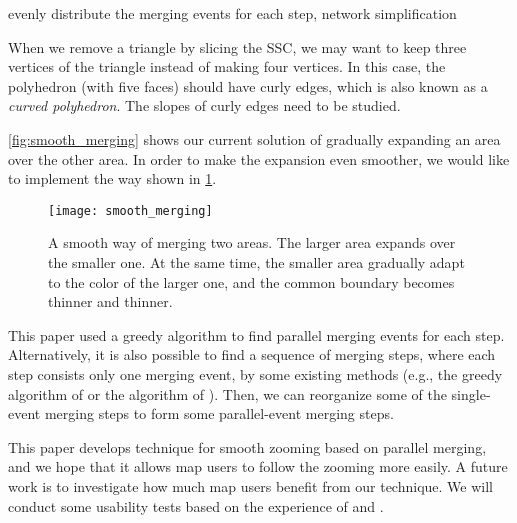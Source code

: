 \documentclass[ijgi,article,submit,moreauthors,pdftex]{Definitions/mdpi}
\begin{document}
evenly distribute the merging events for each step, 
network simplification

When we remove a triangle by slicing the SSC, 
we may want to keep three vertices of the triangle 
instead of making four vertices.
In this case, the polyhedron (with five faces) should have curly edges,
which is also known as a \emph{curved polyhedron}.
The slopes of curly edges need to be studied.

\fig\ref{fig:smooth_merging} shows our current solution of
gradually expanding an area over the other area.
In order to make the expansion even smoother,
we would like to implement the way 
shown in \fig\ref{fig:smooth_merging_future}.

\begin{figure}[tb]
\centering
\texttt{[image: smooth\_merging]}
\caption{A smooth way of merging two areas.
    The larger area expands over the smaller one.
    At the same time, 
    the smaller area gradually adapt to the color of the larger one,
    and the common boundary becomes thinner and thinner.}
\label{fig:smooth_merging_future}
\end{figure}

This paper used a greedy algorithm 
to find parallel merging events for each step.
Alternatively, it is also possible to find a sequence of merging steps,
where each step consists only one merging event, by some existing methods
(e.g., the greedy algorithm of \citet{vanOosterom2005}
or the \Astar algorithm of \citet[]{Peng2019Thesis}).
Then, we can reorganize some of the single-event merging steps 
to form some parallel-event merging steps.

This paper develops technique for smooth zooming based on parallel merging,
and we hope that it allows map users to follow the zooming more easily.
A future work is to investigate 
how much map users benefit from our technique.
We will conduct some usability tests based on the experience of
\citet[]{Suba2017Thesis} and \citet{Midtbo2007}.
\end{document}
